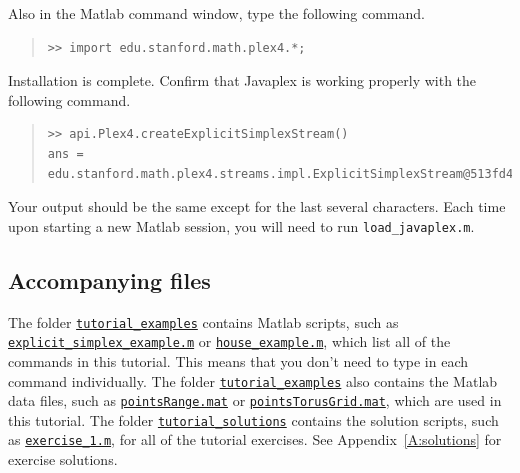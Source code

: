 \documentclass[amscd, amssymb, verbatim]{amsart}[12pt]
\theoremstyle{remark}
\theoremstyle{remark}
\theoremstyle{remark}
\begin{document}
Also in the Matlab command window, type the following command.

\begin{quote} \begin{verbatim} 
>> import edu.stanford.math.plex4.*;
\end{verbatim} \end{quote}

Installation is complete. Confirm that Javaplex is working properly with the following command.

\begin{quote} \begin{verbatim}
>> api.Plex4.createExplicitSimplexStream()
ans = edu.stanford.math.plex4.streams.impl.ExplicitSimplexStream@513fd4
\end{verbatim} \end{quote}

Your output should be the same except for the last several characters. Each time upon starting a new Matlab session, you will need to run \texttt{load\_javaplex.m}.


\subsection{Accompanying files}

The folder \href{https://github.com/appliedtopology/javaplex/tree/master/src/matlab/for_distribution/tutorial_examples}{\texttt{tutorial\_examples}} contains Matlab scripts, such as \\ %
\href{https://github.com/appliedtopology/javaplex/tree/master/src/matlab/for_distribution/tutorial_examples/explicit_simplex_example.m}{\texttt{explicit\_simplex\_example.m}} or \href{https://github.com/appliedtopology/javaplex/tree/master/src/matlab/for_distribution/tutorial_examples/house_example.m}{\texttt{house\_example.m}}, which list all of the commands in this tutorial. This means that you don't need to type in each command individually. The folder \href{https://github.com/appliedtopology/javaplex/tree/master/src/matlab/for_distribution/tutorial_examples}{\texttt{tutorial\_examples}} also contains the Matlab data files, such as \href{https://github.com/appliedtopology/javaplex/tree/master/src/matlab/for_distribution/tutorial_examples/pointsRange.mat}{\texttt{pointsRange.mat}} or \href{https://github.com/appliedtopology/javaplex/tree/master/src/matlab/for_distribution/tutorial_examples/pointsTorusGrid.mat}{\texttt{pointsTorusGrid.mat}}, which are used in this tutorial. The folder \href{https://github.com/appliedtopology/javaplex/tree/master/src/matlab/for_distribution/tutorial_solutions}{\texttt{tutorial\_solutions}} contains the solution scripts, such as \href{https://github.com/appliedtopology/javaplex/tree/master/src/matlab/for_distribution/tutorial_solutions/exercise_1.m}{\texttt{exercise\_1.m}}, for all of the tutorial exercises. See Appendix~\ref{A:solutions} for exercise solutions.
\end{document}
